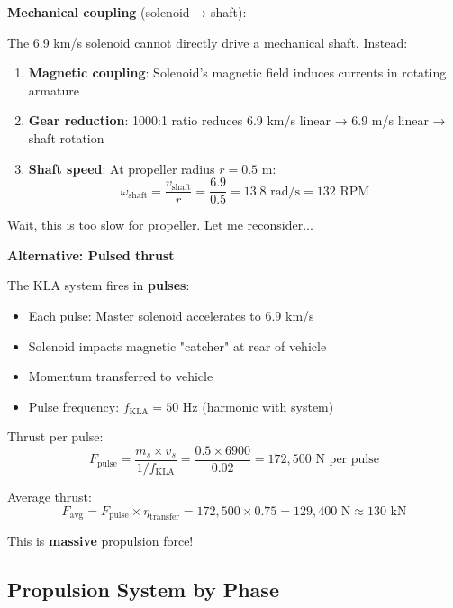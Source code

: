 \documentclass[12pt,a4paper]{article}
\begin{document}
\textbf{Mechanical coupling} (solenoid → shaft):

The 6.9 km/s solenoid cannot directly drive a mechanical shaft. Instead:

\begin{enumerate}
\item \textbf{Magnetic coupling}: Solenoid's magnetic field induces currents in rotating armature
\item \textbf{Gear reduction}: 1000:1 ratio reduces 6.9 km/s linear → 6.9 m/s linear → shaft rotation
\item \textbf{Shaft speed}: At propeller radius $r = 0.5$ m:
\begin{equation}
\omega_{\text{shaft}} = \frac{v_{\text{shaft}}}{r} = \frac{6.9}{0.5} = 13.8 \text{ rad/s} = 132 \text{ RPM}
\end{equation}
\end{enumerate}

Wait, this is too slow for propeller. Let me reconsider...

\textbf{Alternative: Pulsed thrust}

The KLA system fires in \textbf{pulses}:
\begin{itemize}
\item Each pulse: Master solenoid accelerates to 6.9 km/s
\item Solenoid impacts magnetic "catcher" at rear of vehicle
\item Momentum transferred to vehicle
\item Pulse frequency: $f_{\text{KLA}} = 50$ Hz (harmonic with system)
\end{itemize}

Thrust per pulse:
\begin{equation}
F_{\text{pulse}} = \frac{m_s \times v_s}{1/f_{\text{KLA}}} = \frac{0.5 \times 6900}{0.02} = 172,500 \text{ N per pulse}
\end{equation}

Average thrust:
\begin{equation}
F_{\text{avg}} = F_{\text{pulse}} \times \eta_{\text{transfer}} = 172,500 \times 0.75 = 129,400 \text{ N} \approx 130 \text{ kN}
\end{equation}

This is \textbf{massive} propulsion force!

\subsection{Propulsion System by Phase}
\end{document}
